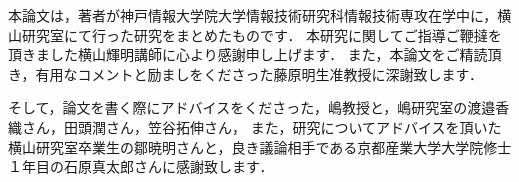 本論文は，著者が神戸情報大学院大学情報技術研究科情報技術専攻在学中に，横山研究室にて行った研究をまとめたものです．
本研究に関してご指導ご鞭撻を頂きました横山輝明講師に心より感謝申し上げます．
また，本論文をご精読頂き，有用なコメントと励ましをくださった藤原明生准教授に深謝致します．
\medskip

そして，論文を書く際にアドバイスをくださった，嶋教授と，嶋研究室の渡邉香織さん，田頭潤さん，笠谷拓伸さん，
また，研究についてアドバイスを頂いた横山研究室卒業生の鄒暁明さんと，良き議論相手である京都産業大学大学院修士１年目の石原真太郎さんに感謝致します．




